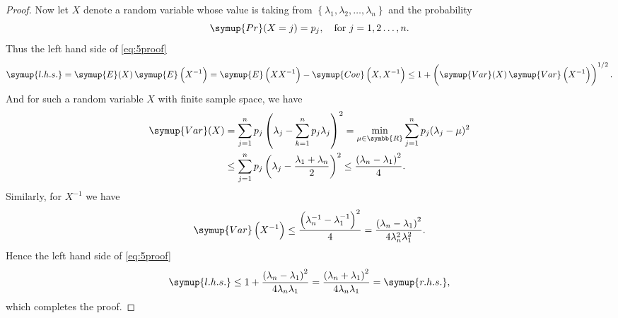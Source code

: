 \documentclass{assignment}[2019/09/15]
\newcommand{\pr}{\mathop{}\!\symup{Pr}}
\newcommand{\expect}{\mathop{}\!\symup{E}}
\newcommand{\cov}{\mathop{}\!\symup{Cov}}
\newcommand{\var}{\mathop{}\!\symup{Var}}
\begin{document}
\begin{proof}
        Now let $X$ denote a random variable whose value is taking from $\left\{\lambda_1, \lambda_2, \dotsc, \lambda_n\right\}$ and the probability
        \begin{equation}
            \pr(X=j)=p_j,\quad\text{for}\ j=1,2\dotsc,n.
        \end{equation}
        Thus the left hand side of \ref{eq:5proof}
        \begin{equation}
            \symup{l.h.s.}=\expect(X)\expect\left(X^{-1}\right)=\expect\left(XX^{-1}\right)-\cov\left(X,X^{-1}\right)\leq 1+\left(\var(X)\var\left(X^{-1}\right)\right)^{1/2}.
        \end{equation}
        And for such a random variable $X$ with finite sample space, we have
        \begin{equation}
            \begin{aligned}
                \var(X)
                &=\sum_{j=1}^{n}p_j\left(\lambda_j-\sum_{k
                =1}^np_j\lambda_j\right)^2
                =\min_{\mu\in\symbb{R}}\sum_{j=1}^np_j(\lambda_j-\mu)^2\\
                &\leq \sum_{j=1}^np_j\left(\lambda_j-\frac{\lambda_1+\lambda_n}{2}\right)^2
                \leq \frac{\left(\lambda_n-\lambda_1\right)^2}{4}.
            \end{aligned}
        \end{equation}
        Similarly, for $X^{-1}$ we have
        \begin{equation}
            \var\left(X^{-1}\right) \leq \frac{\left(\lambda_n^{-1}-\lambda_1^{-1}\right)^2}{4}
            =\frac{\left(\lambda_n-\lambda_1\right)^2}{4\lambda_n^2\lambda_1^2}.
        \end{equation}
        Hence the left hand side of \ref{eq:5proof}
        \begin{equation}
            \symup{l.h.s.}\leq 1+\frac{\left(\lambda_n-\lambda_1\right)^2}{4\lambda_n\lambda_1}=\frac{\left(\lambda_n+\lambda_1\right)^2}{4\lambda_n\lambda_1}=\symup{r.h.s.},
        \end{equation}
        which completes the proof.
    \end{proof}
\end{document}

